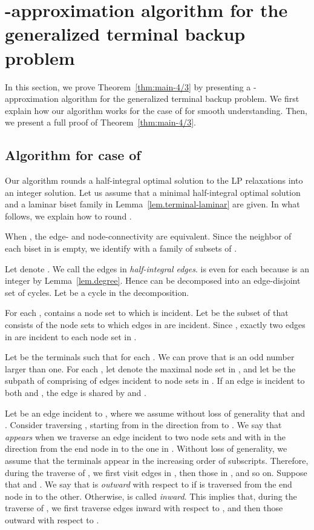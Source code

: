 \documentclass{article}
\begin{document}
\section{-approximation algorithm for the generalized terminal backup problem}
\label{sec.algorithm}

In this section, we prove Theorem~\ref{thm:main-4/3} by presenting
a -approximation algorithm for the generalized terminal backup
problem.
We first explain how our algorithm works for the case of  
for smooth understanding.
Then, we present a full proof of Theorem~\ref{thm:main-4/3}.


\subsection{Algorithm for case of }


Our algorithm rounds a half-integral optimal solution to the LP
relaxations into an integer solution.
Let us assume that a minimal half-integral optimal solution  and a
laminar biset family  in Lemma~\ref{lem.terminal-laminar}
are given.
In what follows, we explain how to round .

When , the edge- and node-connectivity are equivalent.
Since the neighbor of each biset in  is empty,
we identify  with a family of subsets of .

Let  denote .
We call the edges in  \emph{half-integral edges}.
 is even for each 
because  is an integer by Lemma~\ref{lem.degree}.
Hence  can be decomposed into an edge-disjoint set of cycles.
Let  be a cycle in the decomposition.

For each ,  contains a node set to which  is
incident.
Let  be the subset of  that consists of the node sets
to which edges in  are incident.
Since ,
 exactly two edges in  are incident to
each node set in .

Let  be the terminals such that  for each .
We can prove that  is an odd number larger than one.
For each ,
let  denote the maximal node set in
,
and let  be the subpath of  comprising of edges incident to node
sets in .
If an edge is incident to both  and , the edge is
shared by  and .

Let  be an edge incident to , where we assume without loss
of generality that  and  .
Consider traversing , starting from  in the direction from
 to . 
We say that  \emph{appears} when
we traverse an edge incident to two node sets  and  with  in the direction from the end node in
 to the one in .
Without loss of generality, we assume that the terminals appear in the increasing order
of subscripts.
Therefore, during the traverse of , we first visit edges in ,
then those in , and so on.
Suppose that  and .
We say that  is \emph{outward} with respect to  if  is
traversed from the end node in  to the other.
Otherwise,  is called \emph{inward}.
This implies that, during the traverse of ,
we first traverse edges inward with respect to , and then those
outward with respect to .
\end{document}
